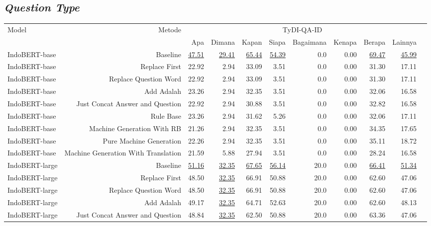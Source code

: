 \subsection{\emph{Question Type}}
\begin{table}[H]\centering
\tiny
\begin{tabular}{lrrrrrrrrrr}\toprule
\multirow{2}{*}{Model} &\multirow{2}{*}{Metode} &\multicolumn{8}{c}{TyDI-QA-ID} \\\cmidrule{3-10}
& &Apa &Dimana &Kapan &Siapa &Bagaimana &Kenapa &Berapa &Lainnya \\\midrule
IndoBERT-base &Baseline &\underline{47.51} &\underline{29.41} &\underline{65.44} &\underline{54.39} &0.0 &0.00 &\underline{69.47} &\underline{45.99} \\
IndoBERT-base &Replace First &22.92 &2.94 &33.09 &3.51 &0.0 &0.00 &31.30 &17.11 \\
IndoBERT-base &Replace Question Word &22.92 &2.94 &33.09 &3.51 &0.0 &0.00 &31.30 &17.11 \\
IndoBERT-base &Add Adalah &23.26 &2.94 &32.35 &3.51 &0.0 &0.00 &32.06 &16.58 \\
IndoBERT-base &Just Concat Answer and Question &22.92 &2.94 &30.88 &3.51 &0.0 &0.00 &32.82 &16.58 \\
IndoBERT-base &Rule Base &23.26 &2.94 &31.62 &5.26 &0.0 &0.00 &32.06 &17.11 \\
IndoBERT-base &Machine Generation With RB &21.26 &2.94 &32.35 &3.51 &0.0 &0.00 &34.35 &17.65 \\
IndoBERT-base &Pure Machine Generation &22.26 &2.94 &32.35 &3.51 &0.0 &0.00 &35.11 &18.72 \\
IndoBERT-base &Machine Generation With Translation &21.59 &5.88 &27.94 &3.51 &0.0 &0.00 &28.24 &16.58 \\
\hline
IndoBERT-large &Baseline &\underline{51.16} &\underline{32.35} &\underline{67.65} &\underline{56.14} &20.0 &0.00 &\underline{66.41} &\underline{51.34} \\
IndoBERT-large &Replace First &48.50 &\underline{32.35} &66.91 &50.88 &20.0 &0.00 &62.60 &47.06 \\
IndoBERT-large &Replace Question Word &48.50 &\underline{32.35} &66.91 &50.88 &20.0 &0.00 &62.60 &47.06 \\
IndoBERT-large &Add Adalah &49.17 &\underline{32.35} &64.71 &52.63 &20.0 &0.00 &62.60 &48.13 \\
IndoBERT-large &Just Concat Answer and Question &48.84 &\underline{32.35} &62.50 &50.88 &20.0 &0.00 &63.36 &47.06 \\

\end{tabular}
\end{table}
